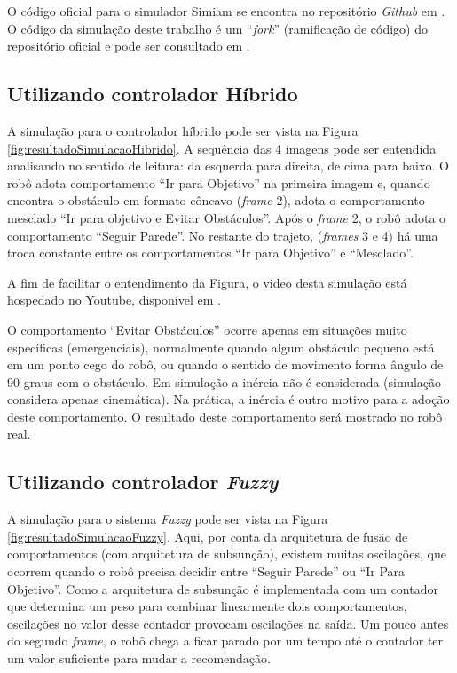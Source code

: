 	O código oficial para o simulador Simiam se encontra no repositório \textit{Github}
	em . O código da simulação deste trabalho 
	é um ``\textit{fork}'' (ramificação de código) do repositório oficial e pode ser 
	consultado em .
	
	\subsection{Utilizando controlador Híbrido}
	
	A simulação para o controlador híbrido pode ser vista na Figura 
	\ref{fig:resultadoSimulacaoHibrido}. A sequência das 4 imagens pode ser entendida 
	analisando no sentido de leitura: da esquerda para direita, de cima para baixo. O 
	robô adota comportamento ``Ir para Objetivo'' na primeira imagem e, quando encontra 
	o obstáculo em formato côncavo (\textit{frame} 2), adota o comportamento mesclado 
	``Ir para objetivo e Evitar Obstáculos''. Após o \textit{frame} 2, o robô adota o 
	comportamento ``Seguir Parede''. No restante do trajeto, (\textit{frames} 3 e 4) há 
	uma troca constante entre os comportamentos ``Ir para Objetivo'' e ``Mesclado''.
	
	
	
	A fim de facilitar o entendimento da Figura, o video desta simulação está hospedado
	no Youtube, disponível em .
	
	O comportamento ``Evitar Obstáculos'' ocorre apenas em situações muito específicas
	(emergenciais), normalmente quando algum obstáculo pequeno está em um ponto cego do 
	robô, ou quando o sentido de movimento forma ângulo de 90 graus com o obstáculo. Em 
	simulação a inércia não é considerada (simulação considera apenas cinemática). Na 
	prática, a inércia é outro motivo para a adoção deste comportamento. O resultado 
	deste comportamento será mostrado no robô real.
	
	\subsection{Utilizando controlador \textit{Fuzzy}}
	
	A simulação para o sistema \textit{Fuzzy} pode ser vista na Figura 
	\ref{fig:resultadoSimulacaoFuzzy}. Aqui, por conta da arquitetura de fusão de 
	comportamentos (com arquitetura de subsunção), existem muitas oscilações, que 
	ocorrem quando o robô precisa decidir entre ``Seguir Parede'' ou ``Ir Para Objetivo''. 
	Como a arquitetura de subsunção é implementada com um contador que determina um peso 
	para combinar linearmente dois comportamentos, oscilações no valor desse contador 
	provocam oscilações na saída. Um pouco antes do segundo \textit{frame}, o robô chega 
	a ficar parado por um tempo até o contador ter um valor suficiente para mudar a 
	recomendação. 
	
